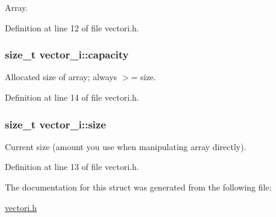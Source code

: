 \-Array. 



\-Definition at line 12 of file vectori.\-h.

\hypertarget{structvector__i_a8e7421832635519ee2ccebd19298b705}{
\subsubsection[{capacity}]{\setlength{\rightskip}{0pt plus 5cm}size\-\_\-t {\bf vector\-\_\-i\-::capacity}}}\label{structvector__i_a8e7421832635519ee2ccebd19298b705}


\-Allocated size of array; always $>$= size. 



\-Definition at line 14 of file vectori.\-h.

\hypertarget{structvector__i_a8df52068982f4b7dcaa024b37f243282}{
\subsubsection[{size}]{\setlength{\rightskip}{0pt plus 5cm}size\-\_\-t {\bf vector\-\_\-i\-::size}}}\label{structvector__i_a8df52068982f4b7dcaa024b37f243282}


\-Current size (amount you use when manipulating array directly). 



\-Definition at line 13 of file vectori.\-h.



\-The documentation for this struct was generated from the following file\-:\begin{DoxyCompactItemize}
\item 
\hyperlink{vectori_8h}{vectori.\-h}\end{DoxyCompactItemize}

